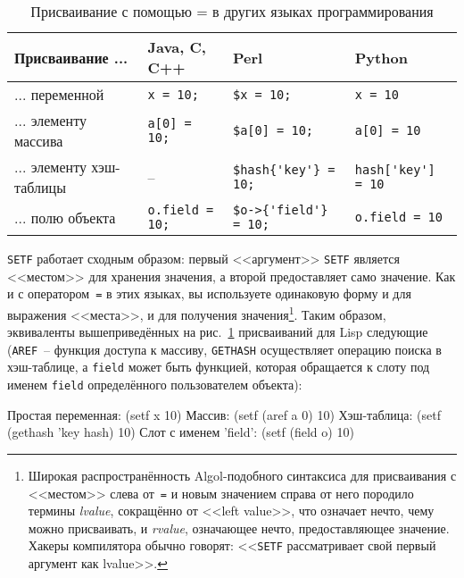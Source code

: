\begin{table}[tbh]
\begin{tabular}{|m{42mm}|>{\centering}m{23mm}|>{\centering}m{30mm}|>{\centering}m{25mm}|}
\hline
Присваивание ...         & Java, C, C++        & Perl                & Python \\
\hline
... переменной           & \lstinline!x = 10;! & \lstinline!$x = 10;! & \lstinline!x = 10! \\
... элементу массива     & \lstinline!a[0] = 10;! & \lstinline!$a[0] = 10;! & \lstinline!a[0] = 10! \\
... элементу хэш-таблицы & --                  & \lstinline!$hash{'key'} = 10;!  & \lstinline!hash['key'] = 10! \\
... полю объекта         & \lstinline!o.field = 10;! & \lstinline!$o->{'field'} = 10;! & \lstinline!o.field = 10! \\
\hline
\end{tabular}
  \caption{Присваивание с помощью = в других языках программирования} 
  \label{table:06-1}
\end{table}


\lstinline{SETF} работает сходным образом: первый <<аргумент>> \lstinline{SETF} является
<<местом>> для хранения значения, а второй предоставляет само значение. Как и с оператором~\lstinline{=}
в этих языках, вы используете одинаковую форму и для выражения <<места>>, и для
получения значения\footnote{Широкая распространённость Algol-подобного синтаксиса для
  присваивания с <<местом>> слева от~\lstinline{=} и новым значением справа от него породило термины
  \textit{lvalue}, сокращённо от <<left value>>, что означает нечто, чему можно
  присваивать, и \textit{rvalue}, означающее нечто, предоставляющее значение. Хакеры
  компилятора обычно говорят: <<\lstinline{SETF} рассматривает свой первый аргумент как
  lvalue>>.}. Таким образом, эквиваленты вышеприведённых на рис.~\ref{table:06-1} присваиваний для
Lisp следующие (\lstinline{AREF}~-- функция доступа к массиву, \lstinline{GETHASH} осуществляет
операцию поиска в хэш-таблице, а \lstinline{field} может быть функцией, которая обращается к слоту под
именем \lstinline{field} определённого пользователем объекта):

\begin{myverb}
Простая переменная:    (setf x 10) 
Массив:                (setf (aref a 0) 10)
Хэш-таблица:           (setf (gethash 'key hash) 10)
Слот с именем 'field': (setf (field o) 10)
\end{myverb}

